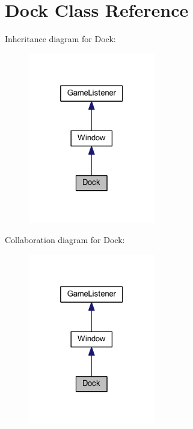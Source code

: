 \hypertarget{class_dock}{}\section{Dock Class Reference}
\label{class_dock}


Inheritance diagram for Dock\+:\nopagebreak
\begin{figure}[H]
\begin{center}
\leavevmode
\includegraphics[width=157pt]{class_dock__inherit__graph}
\end{center}
\end{figure}


Collaboration diagram for Dock\+:\nopagebreak
\begin{figure}[H]
\begin{center}
\leavevmode
\includegraphics[width=157pt]{class_dock__coll__graph}
\end{center}
\end{figure}
